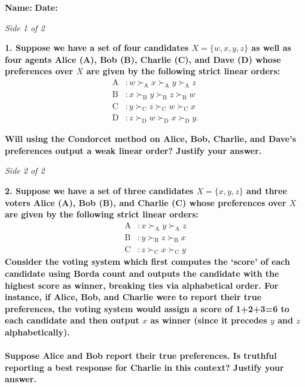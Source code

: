 \documentclass[12pt]{article}
\begin{document}
\noindent
\textbf{Name:}\underline{\hspace{6cm}} \hfill \textbf{Date:}\underline{\hspace{3cm}}

\vspace{0.5em}
\noindent\textit{Side 1 of 2}

\vspace{1.5em}
\noindent\textbf{1. Suppose we have a set of four candidates $X=\{w,x,y,z\}$ as well as four agents Alice (A), Bob (B), Charlie (C), and Dave (D) whose preferences over $X$ are given by the following strict linear orders:}
\begin{align*}
\text{A}&: w \succ_\text{A} x	\succ_\text{A} y \succ_\text{A} z
\\
\text{B}&: x \succ_\text{B} y	\succ_\text{B} z \succ_\text{B} w
\\
\text{C}&: y \succ_\text{C} z	\succ_\text{C} w \succ_\text{C} x
\\
\text{D}&: z \succ_\text{D} w	\succ_\text{D} x \succ_\text{D} y.
\end{align*}

\noindent \textbf{Will using the Condorcet method on Alice, Bob, Charlie, and Dave's preferences output a weak linear order? Justify your answer.}

\vfill
\newpage

\noindent\textit{Side 2 of 2}

\vspace{1.5em}
\noindent \textbf{2. Suppose we have a set of three candidates $X=\{x,y,z\}$ and three voters Alice (A), Bob (B), and Charlie (C) whose preferences over $X$ are given by the following strict linear orders:}
\begin{align*}
\text{A}&: x	\succ_\text{A} y \succ_\text{A} z
\\
\text{B}&: y \succ_\text{B} z 	\succ_\text{B} x 
\\
\text{C}&: z \succ_\text{C} x 	\succ_\text{C}  y
\end{align*}
\noindent \textbf{Consider the voting system which first computes the `score' of each candidate using Borda count and outputs the candidate with the highest score as winner, breaking ties via alphabetical order. For instance, if Alice, Bob, and Charlie were to report their true preferences, the voting system would assign a score of 1+2+3=6 to each candidate and then output $x$ as winner (since it precedes $y$ and $z$ alphabetically).}
\\
\\
\noindent \textbf{Suppose Alice and Bob report their true preferences. Is truthful reporting a best response for Charlie in this context? Justify your answer.}
\vfill
\end{document}
